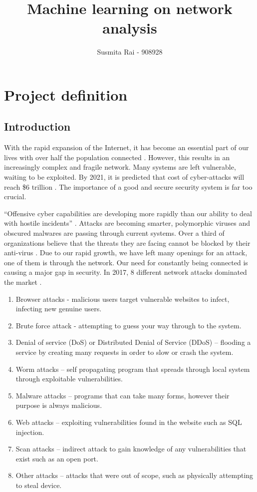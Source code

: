 \documentclass[11pt]{article}
\begin{document}
\title{Machine learning on network analysis}
\author{Susmita Rai - 908928}
\date{}
\maketitle
\newpage

\tableofcontents
\newpage

\setlength{\parskip}{0.5em}

\section{Project definition}
\subsection{Introduction}
With the rapid expansion of the Internet, it has become an essential part of our lives with over half the population connected \cite{wearesocial}. However, this results in an increasingly complex and fragile network. Many systems are left vulnerable, waiting to be exploited. By 2021, it is predicted that cost of cyber-attacks will reach \$6 trillion \cite{varonis}. The importance of a good and secure security system is far too crucial.

“Offensive cyber capabilities are developing more rapidly than our ability to deal with hostile incidents” \cite{globalrisks}. Attacks are becoming smarter, polymorphic viruses and obscured malwares are passing through current systems. Over a third of organizations believe that the threats they are facing cannot be blocked by their anti-virus \cite{varonis}. 
Due to our rapid growth, we have left many openings for an attack, one of them is through the network. Our need for constantly being connected is causing a major gap in security. In 2017, 8 different network attacks dominated the market \cite{network-attack-types}.

\begin{enumerate}
  \item Browser attacks - malicious users target vulnerable websites to infect, infecting new genuine users. 
  \item Brute force attack - attempting to guess your way through to the system. 
  \item Denial of service (DoS) or Distributed Denial of Service (DDoS) – flooding a service by creating many requests in order to slow or crash the system.
  \item Worm attacks – self propagating program that spreads through local system through exploitable vulnerabilities.
  \item Malware attacks – programs that can take many forms, however their purpose is always malicious.
  \item Web attacks – exploiting vulnerabilities found in the website such as SQL injection.
  \item Scan attacks – indirect attack to gain knowledge of any vulnerabilities that exist such as an open port. 
  \item Other attacks – attacks that were out of scope, such as physically attempting to steal device.
\end{enumerate}
\end{document}
